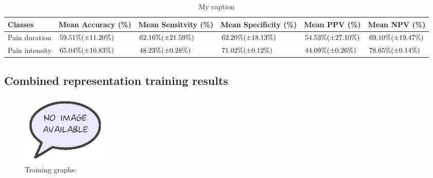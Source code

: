 \documentclass[12pt,a4paper]{article}
\begin{document}
\begin{table}[H]
\centering
\begin{tabular}{|p{2cm}|p{2.2cm}|p{2.2cm}|p{2.2cm}|p{2cm}|p{2cm}|}
\hline
Classes          & Mean Accuracy (\%) & Mean Sensitvity (\%) & Mean Specificity (\%) & Mean PPV (\%) & Mean NPV (\%) \\ \hline
Pain duration & $59.51\%\newline(\pm11.20\%)$ & $62.16\%\newline(\pm21.59\%)$ & $62.20\%\newline(\pm18.13\%)$ & $54.53\%\newline(\pm27.10\%)$ & $69.10\%\newline(\pm19.47\%)$ \\ \hline
Pain intensity   & $65.04\%\newline(\pm10.83\%)$ & $48.23\%\newline(\pm0.28\%)$ & $71.02\%\newline(\pm0.12\%)$ & $44.09\%\newline(\pm0.26\%)$ & $78.65\%\newline(\pm0.14\%)$ \\ \hline
\end{tabular}
\label{my-label}
\caption{My caption}
\end{table}

\subsection{Combined representation training results}
\begin{figure} [H]
\centering
\includegraphics[width=0.2\textwidth]{figures/missimage}
\caption{Training graphs:}
\label{fig:combinedGraph}  
\end{figure}
\end{document}
